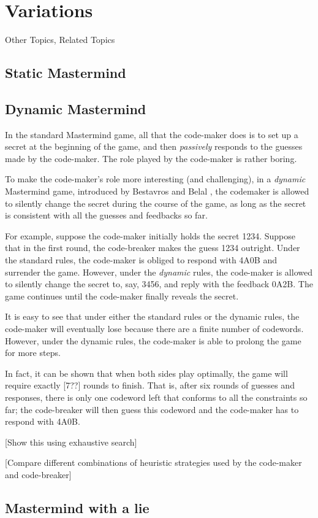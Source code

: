 \chapter{Variations}

Other Topics, Related Topics

\section{Static Mastermind}

\section{Dynamic Mastermind}

In the standard Mastermind game, all that the code-maker does is to set up a secret at the beginning of the game, and then \emph{passively} responds to the guesses made by the code-maker. The role played by the code-maker is rather boring.

To make the code-maker's role more interesting (and challenging), in a \emph{dynamic} Mastermind game, introduced by Bestavros and Belal \cite{bestavros86}, the codemaker is allowed to silently change the secret during the course of the game, as long as the secret is consistent with all the guesses and feedbacks so far. 

For example, suppose the code-maker initially holds the secret 1234. Suppose that in the first round, the code-breaker makes the guess 1234 outright. Under the standard rules, the code-maker is obliged to respond with 4A0B and surrender the game. However, under the \emph{dynamic} rules, the code-maker is allowed to silently change the secret to, say, 3456, and reply with the feedback 0A2B. The game continues until the code-maker finally reveals the secret.

It is easy to see that under either the standard rules or the dynamic rules, the code-maker will eventually lose because there are a finite number of codewords. However, under the dynamic rules, the code-maker is able to prolong the game for more steps. 

In fact, it can be shown that when both sides play optimally, the game will require exactly [7??] rounds to finish. That is, after six rounds of guesses and responses, there is only one codeword left that conforms to all the constraints so far; the code-breaker will then guess this codeword and the code-maker has to respond with 4A0B.

[Show this using exhaustive search]

[Compare different combinations of heuristic strategies used by the code-maker and code-breaker]


\section{Mastermind with a lie}

